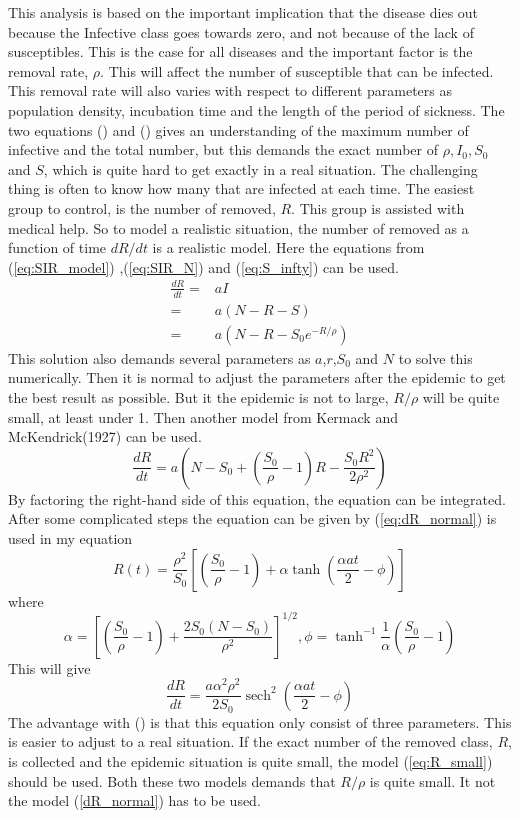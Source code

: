\documentclass[%
twoside,                 %
final,                   %
10pt]{article}
\begin{document}
This analysis is based on the important implication that the disease dies out because the Infective class goes towards zero, and not because of the lack of susceptibles. This is the case for all diseases and the important factor is the removal rate, $\rho$. This will affect the number of susceptible that can be infected. This removal rate will also varies with respect to different parameters as population density, incubation time and the length of the period of sickness. The two equations (\label{eq:max_I}) and (\label{eq:total_I}) gives an understanding of the maximum number of infective and the total number, but this demands the exact number of $\rho,I_0,S_0$ and $S$, which is quite hard to get exactly in a real situation. The challenging thing is often to know how many that are infected at each time. The easiest group to control, is the number of removed, $R$. This group is assisted with medical help. So to model a realistic situation, the number of removed as a function of time $dR/dt$ is a realistic model. Here the equations from (\ref{eq:SIR_model}) ,(\ref{eq:SIR_N}) and (\ref{eq:S_infty}) can be used.
\begin{align*} \label{eq:dR_normal}
\frac{dR}{dt} =& aI\\
=& a(N-R-S)\\
=& a(N-R-S_0e^{-R/\rho})
\end{align*}
This solution also demands several parameters as $a$,$r$,$S_0$ and $N$ to solve this numerically. Then it is normal to adjust the parameters after the epidemic to get the best result as possible. But it the epidemic is not to large, $R/\rho$ will be quite small, at least under 1. Then another model from Kermack and McKendrick(1927) can be used.
\begin{equation}
\frac{dR}{dt} = a(N-S_0+(\frac{S_0}{\rho}-1)R-\frac{S_0R^2}{2\rho^2})
\end{equation}
By factoring the right-hand side of this equation, the equation can be integrated. After some complicated steps the equation can be given by (\ref{eq:dR_normal}) is used in my equation
\begin{equation} \label{eq:R_small}
R(t) = \frac{\rho^2}{S_0}\left[\left(\frac{S_0}{\rho}-1\right)+\alpha \tanh\left(\frac{\alpha at}{2}-\phi\right)\right]
\end{equation}
where
\begin{equation}
\alpha = \left[\left(\frac{S_0}{\rho}-1\right)+\frac{2S_0(N-S_0)}{\rho^2}\right]^{1/2}, \phi= \tanh^{-1}\frac{1}{\alpha}\left(\frac{S_0}{\rho}-1\right)
\end{equation}
This will give
\DeclareMathOperator{\sech}{sech}
\begin{equation} \label{eq:dR_small}
\frac{dR}{dt} = \frac{a\alpha^2\rho^2}{2S_0}\sech^2\left(\frac{\alpha at}{2}-\phi\right)
\end{equation}
The advantage with (\label{eq:dR_small}) is that this equation only consist of three parameters. This is easier to adjust to a real situation. If the exact number of the removed class, $R$, is collected and the epidemic situation is quite small, the model (\ref{eq:R_small}) should be used. Both these two models demands that $R/\rho$ is quite small. It not the model (\ref{dR_normal}) has to be used.
\\
\\
\end{document}
